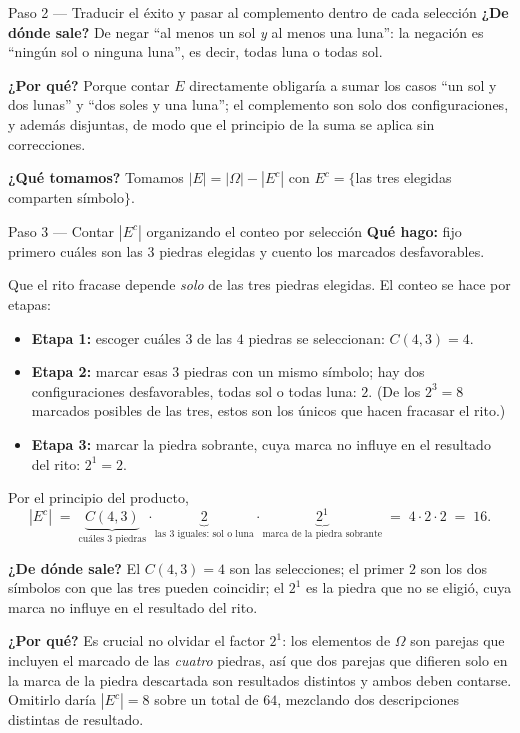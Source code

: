 \documentclass[11pt]{article}
\begin{document}
\begin{sol}
\begin{paso}{Paso 2 --- Traducir el \'exito y pasar al complemento dentro de cada selecci\'on}
\textbf{¿De d\'onde sale?} De negar ``al menos un sol \emph{y} al menos una luna'': la negaci\'on es ``ning\'un sol o ninguna luna'', es decir, todas luna o todas sol.

\textbf{¿Por qu\'e?} Porque contar $E$ directamente obligar\'ia a sumar los casos ``un sol y dos lunas'' y ``dos soles y una luna''; el complemento son solo dos configuraciones, y adem\'as disjuntas, de modo que el principio de la suma se aplica sin correcciones.

\textbf{¿Qu\'e tomamos?} Tomamos $|E|=|\Omega|-|E^{c}|$ con $E^{c}=\{$las tres elegidas comparten s\'imbolo$\}$.
\end{paso}

\begin{paso}{Paso 3 --- Contar $|E^{c}|$ organizando el conteo por selecci\'on}
\textbf{Qu\'e hago:} fijo primero cu\'ales son las $3$ piedras elegidas y cuento los marcados desfavorables.

Que el rito fracase depende \emph{solo} de las tres piedras elegidas. El conteo se hace por etapas:
\begin{itemize}[leftmargin=*]
  \item \textbf{Etapa 1:} escoger cu\'ales $3$ de las $4$ piedras se seleccionan: $C(4,3)=4$.
  \item \textbf{Etapa 2:} marcar esas $3$ piedras con un mismo s\'imbolo; hay dos configuraciones desfavorables, todas sol o todas luna: $2$. (De los $2^{3}=8$ marcados posibles de las tres, estos son los \'unicos que hacen fracasar el rito.)
  \item \textbf{Etapa 3:} marcar la piedra sobrante, cuya marca no influye en el resultado del rito: $2^{1}=2$.
\end{itemize}
Por el principio del producto,
\[
|E^{c}| \;=\; \underbrace{C(4,3)}_{\text{cu\'ales 3 piedras}}\cdot\underbrace{2}_{\text{las 3 iguales: sol o luna}}\cdot\underbrace{2^{1}}_{\text{marca de la piedra sobrante}}
\;=\;4\cdot 2\cdot 2\;=\;16 .
\]

\textbf{¿De d\'onde sale?} El $C(4,3)=4$ son las selecciones; el primer $2$ son los dos s\'imbolos con que las tres pueden coincidir; el $2^{1}$ es la piedra que no se eligi\'o, cuya marca no influye en el resultado del rito.

\textbf{¿Por qu\'e?} Es crucial no olvidar el factor $2^{1}$: los elementos de $\Omega$ son parejas que incluyen el marcado de las \emph{cuatro} piedras, as\'i que dos parejas que difieren solo en la marca de la piedra descartada son resultados distintos y ambos deben contarse. Omitirlo dar\'ia $|E^{c}|=8$ sobre un total de $64$, mezclando dos descripciones distintas de resultado.


\end{paso}
\end{sol}
\end{document}
